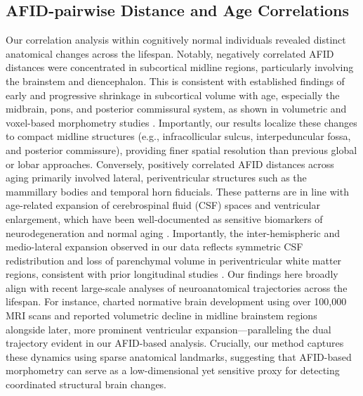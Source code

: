 \subsection{AFID-pairwise Distance and Age Correlations}
Our correlation analysis within cognitively normal individuals revealed distinct anatomical changes across the lifespan. Notably, negatively correlated AFID distances were concentrated in subcortical midline regions, particularly involving the brainstem and diencephalon. This is consistent with established findings of early and progressive shrinkage in subcortical volume with age, especially the midbrain, pons, and posterior commissural system, as shown in volumetric and voxel-based morphometry studies \cite{Dima2022-dp, Raz2005-jr}. Importantly, our results localize these changes to compact midline structures (e.g., infracollicular sulcus, interpeduncular fossa, and posterior commissure), providing finer spatial resolution than previous global or lobar approaches. Conversely, positively correlated AFID distances across aging primarily involved lateral, periventricular structures such as the mammillary bodies and temporal horn fiducials. These patterns are in line with age-related expansion of cerebrospinal fluid (CSF) spaces and ventricular enlargement, which have been well-documented as sensitive biomarkers of neurodegeneration and normal aging \cite{Fujita2023-vi,Resnick2003-je,Bethlehem2022-ow}. Importantly, the inter-hemispheric and medio-lateral expansion observed in our data reflects symmetric CSF redistribution and loss of parenchymal volume in periventricular white matter regions, consistent with prior longitudinal studies \cite{Fujita2023-vi,De-Vis2016-li}. Our findings here broadly align with recent large-scale analyses of neuroanatomical trajectories across the lifespan. For instance, \cite{Bethlehem2022-ow} charted normative brain development using over 100,000 MRI scans and reported volumetric decline in midline brainstem regions alongside later, more prominent ventricular expansion—paralleling the dual trajectory evident in our AFID-based analysis. Crucially, our method captures these dynamics using sparse anatomical landmarks, suggesting that AFID-based morphometry can serve as a low-dimensional yet sensitive proxy for detecting coordinated structural brain changes.

